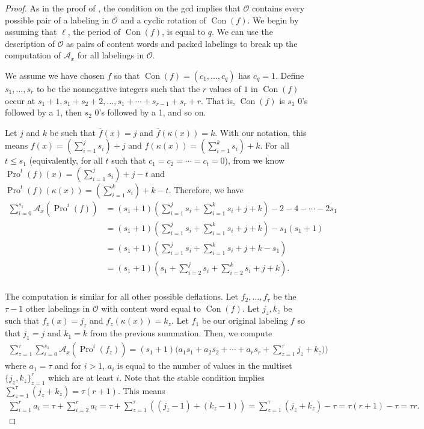 \documentclass[11pt]{amsart}
\theoremstyle{definition}
\DeclareMathOperator{\Pro}{\mathrm{Pro}}
\DeclareMathOperator{\Con}{\mathrm{Con}}
\begin{document}
\begin{proof}
As in the proof of , the condition on the gcd implies that  $\mathcal{O}$ contains every possible pair of a labeling in $\overline{\mathcal{O}}$ and a cyclic rotation of $\Con(f)$. 
We begin by assuming that $\ell$, the period of $\Con(f)$, is equal to $q$.
We can use the description of $\mathcal{O}$ as pairs of content words and packed labelings to break up the computation of $\mathcal{A}_x$ for all labelings in $\mathcal{O}$. 

We assume we have chosen $f$ so that $\Con(f) = (c_1,\ldots,c_q)$ has $c_q = 1$. Define $s_1,\ldots,s_r$ to be the nonnegative integers such that the $r$ values of $1$ in $\Con(f)$ occur at $s_1+1,s_1+s_2 + 2,\ldots,s_1 + \cdots + s_{r-1} + s_r + r$. That is, $\Con(f)$ is $s_1$ 0's followed by a 1, then $s_2$ 0's followed by a 1, and so on.

Let $j$ and $k$ be such that $\overline{f}(x) = j$ and $\overline{f}(\kappa(x)) = k$. With our notation, this means $f(x) = (\sum_{i=1}^j s_i) + j$ and $f(\kappa(x)) = (\sum_{i=1}^k s_i) + k$. For all $t \leq s_1$ (equivalently, for all $t$ such that $c_1 = c_2 = \cdots = c_t = 0$), from  we know $\Pro^t(f)(x) = (\sum_{i=1}^j s_i) + j - t$ and $\Pro^t(f)(\kappa(x)) = (\sum_{i=1}^k s_i) + k - t$.  Therefore, we have
\begin{align*}
\sum_{i=0}^{s_1} \mathcal{A}_x(\Pro^i(f)) &= (s_1 + 1)(\sum_{i=1}^{j} s_i + \sum_{i=1}^{k} s_i + j + k) -2 - 4 - \cdots - 2s_1\\
&= (s_1 + 1)(\sum_{i=1}^{j} s_i + \sum_{i=1}^{k} s_i + j + k) -s_1(s_1+1)\\
& = (s_1 + 1)(\sum_{i=1}^{j} s_i + \sum_{i=1}^{k} s_i + j + k-s_1)\\
& = (s_1 + 1)(s_1 + \sum_{i=2}^{j} s_i + \sum_{i=2}^{k} s_i + j + k).\\
\end{align*}

The computation is similar for all other possible deflations. Let $f_2,\ldots,f_\tau$ be the $\tau-1$ other labelings in $\mathcal{O}$ with content word equal to $\Con(f)$. Let $j_z,k_z$ be such that $f_z(x) = j_z$ and $f_z(\kappa(x)) = k_z$. Let $f_1$ be our original labeling $f$ so that $j_1 = j$ and $k_1 = k$ from the previous summation. Then, we compute
\begin{align}
\sum_{z = 1}^\tau \sum_{i=0}^{s_1} \mathcal{A}_x(\Pro^i(f_z)) = (s_1 + 1)\big(a_1 s_1 + a_2 s_2 + \cdots + a_rs_r + \sum_{z=1}^\tau j_z + k_z)\big)\label{eq:SumFirstSection}
\end{align}
where $a_1 = \tau$ and for $i > 1$, $a_i$ is equal to the number of values in the multiset $\{j_z,k_z\}_{z=1}^r$ which are at least $i$. 
Note that the stable condition implies $\sum_{z=1}^\tau (j_z + k_z) = \tau(r+1)$.  This means \begin{align}
 \sum_{i=1}^r a_i=\tau+\sum_{i=2}^r a_i=\tau+\sum_{z=1}^\tau ((j_z-1)+(k_z-1))=\sum_{z=1}^\tau (j_z+k_z)-\tau= \tau (r+1) - \tau = \tau r.  \label{eq:SimplifySumai} 
\end{align}



\end{proof}
\end{document}
